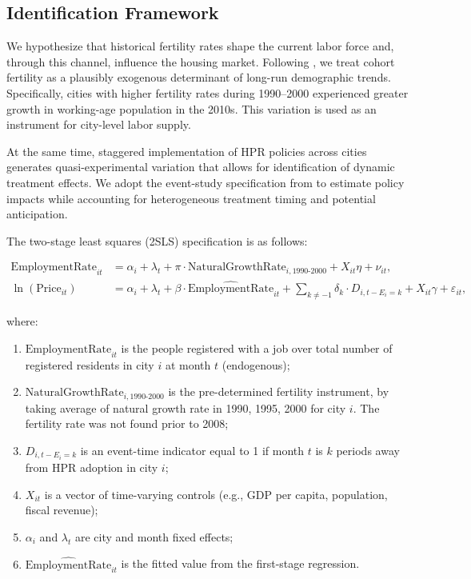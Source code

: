 \documentclass[12pt,english]{article}
\begin{document}
	\subsection{Identification Framework}
	
	We hypothesize that historical fertility rates shape the current labor force and, through this channel, influence the housing market. Following \citet{mankiw1989baby}, we treat cohort fertility as a plausibly exogenous determinant of long-run demographic trends. Specifically, cities with higher fertility rates during 1990--2000 experienced greater growth in working-age population in the 2010s. This variation is used as an instrument for city-level labor supply.
	
	At the same time, staggered implementation of HPR policies across cities generates quasi-experimental variation that allows for identification of dynamic treatment effects. We adopt the event-study specification from \citet{sun2021estimating} to estimate policy impacts while accounting for heterogeneous treatment timing and potential anticipation.
	
	The two-stage least squares (2SLS) specification is as follows:
	
	\begin{align}
		\text{EmploymentRate}_{it} &= \alpha_i + \lambda_t + \pi \cdot \text{NaturalGrowthRate}_{i,1990\text{-}2000} + X_{it} \eta + \nu_{it}, \\
		\ln(\text{Price}_{it}) &= \alpha_i + \lambda_t + \beta \cdot \widehat{\text{EmploymentRate}}_{it} + \sum_{k \neq -1} \delta_k \cdot D_{i,t-E_i=k} + X_{it} \gamma + \varepsilon_{it},
	\end{align}
	
	where:
	\begin{enumerate}
		\item $\text{EmploymentRate}_{it}$ is the people registered with a job over total number of registered residents in city $i$ at month $t$ (endogenous);
		\item $\text{NaturalGrowthRate}_{i,1990\text{-}2000}$ is the pre-determined fertility instrument, by taking average of natural growth rate in 1990, 1995, 2000 for city $i$. The fertility rate was not found prior to 2008;
		\item $D_{i,t-E_i=k}$ is an event-time indicator equal to 1 if month $t$ is $k$ periods away from HPR adoption in city $i$;
		\item $X_{it}$ is a vector of time-varying controls (e.g., GDP per capita, population, fiscal revenue);
		\item $\alpha_i$ and $\lambda_t$ are city and month fixed effects;
		\item $\widehat{\text{EmploymentRate}}_{it}$ is the fitted value from the first-stage regression.
	\end{enumerate}
	
\end{document}
